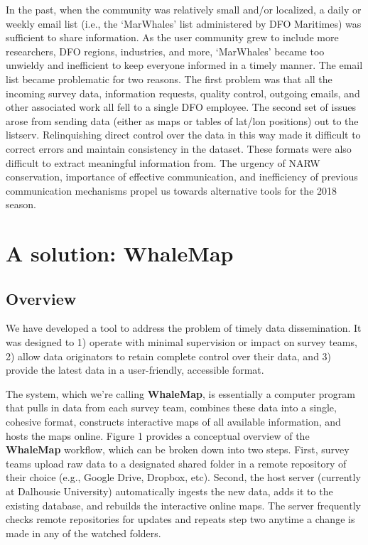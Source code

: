 \documentclass[11pt, letterpaper]{article}
\begin{document}
In the past, when the community was relatively small and/or localized, a daily or weekly email list (i.e., the `MarWhales' list administered by DFO Maritimes) was sufficient to share information. As the user community grew to include more researchers, DFO regions, industries, and more, `MarWhales' became too unwieldy and inefficient to keep everyone informed in a timely manner.  The email list became problematic for two reasons. The first problem was that all the incoming survey data, information requests, quality control, outgoing emails, and other associated work all fell to a single DFO employee. The second set of issues arose from sending data (either as maps or tables of lat/lon positions) out to the listserv. Relinquishing direct control over the data in this way made it difficult to correct errors and maintain consistency in the dataset. These formats were also difficult to extract meaningful information from. The urgency of NARW conservation, importance of effective communication, and inefficiency of previous communication mechanisms propel us towards alternative tools for the 2018 season.

\newpage
\section{A solution: WhaleMap}

\subsection{Overview}

We have developed a tool to address the problem of timely data dissemination. It was designed to 1) operate with minimal supervision or impact on survey teams, 2) allow data originators to retain complete control over their data, and 3) provide the latest data in a user-friendly, accessible format. 

The system, which we're calling \textbf{WhaleMap}, is essentially a computer program that pulls in data from each survey team, combines these data into a single, cohesive format, constructs interactive maps of all available information, and hosts the maps online. Figure 1 provides a conceptual overview of the \textbf{WhaleMap} workflow, which can be broken down into two steps. First, survey teams upload raw data to a designated shared folder in a remote repository of their choice (e.g., Google Drive, Dropbox, etc). Second, the host server (currently at Dalhousie University) automatically ingests the new data, adds it to the existing database, and rebuilds the interactive online maps. The server frequently checks remote repositories for updates and repeats step two anytime a change is made in any of the watched folders.
\end{document}
